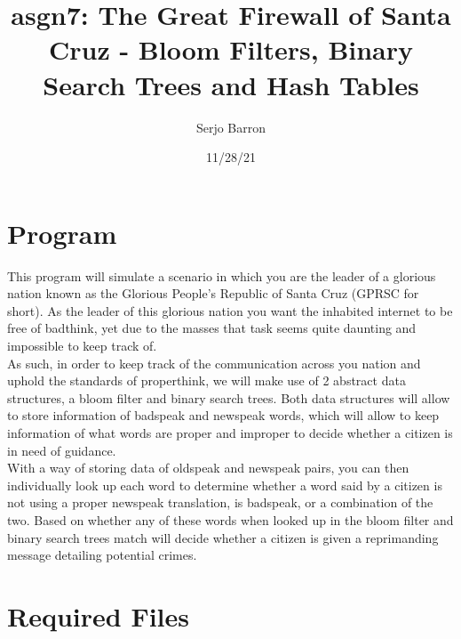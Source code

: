 \documentclass[
	12pt, %
]{fphw}
\title{asgn7: The Great Firewall of Santa Cruz -
Bloom Filters, Binary Search Trees and Hash Tables} %
\author{Serjo Barron} %
\date{11/28/21} %
\begin{document}
\maketitle %


\section{Program}

\hspace{15pt} This program will simulate a scenario in which you are the leader of a glorious nation known as the Glorious People's Republic of Santa Cruz (GPRSC for short). As the leader of this glorious nation you want the inhabited internet to be free of badthink, yet due to the masses that task seems quite daunting and impossible to keep track of. \\
As such, in order to keep track of the communication across you nation and uphold the standards of properthink, we will make use of 2 abstract data structures, a bloom filter and binary search trees. Both data structures will allow to store information of badspeak and newspeak words, which will allow to keep information of what words are proper and improper to decide whether a citizen is in need of guidance. \\
With a way of storing data of oldspeak and newspeak pairs, you can then individually look up each word to determine whether a word said by a citizen is not using a proper newspeak translation, is badspeak, or a combination of the two. Based on whether any of these words when looked up in the bloom filter and binary search trees match will decide whether a citizen is given a reprimanding message detailing potential crimes.


\section{Required Files}
\end{document}
